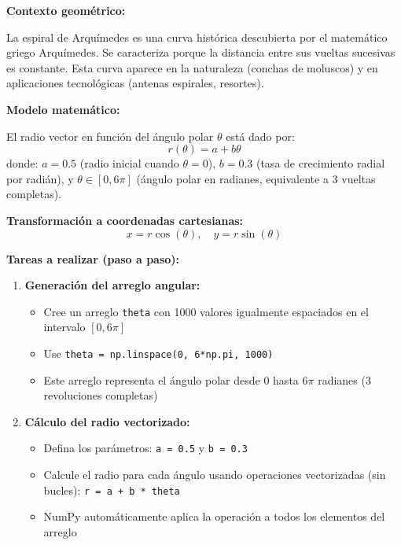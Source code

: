 \documentclass[10pt]{article}
\begin{document}

\begin{tcolorbox}[title={Pregunta 2 – Espiral de Arquímedes parametrizada}]

\noindent\textbf{Contexto geométrico:}

La espiral de Arquímedes es una curva histórica descubierta por el matemático griego Arquímedes. Se caracteriza porque la distancia entre sus vueltas sucesivas es constante. Esta curva aparece en la naturaleza (conchas de moluscos) y en aplicaciones tecnológicas (antenas espirales, resortes).

\noindent\textbf{Modelo matemático:}

El radio vector en función del ángulo polar $\theta$ está dado por:
\[
r(\theta) = a + b \theta
\]
donde: $a = 0.5$ (radio inicial cuando $\theta = 0$), $b = 0.3$ (tasa de crecimiento radial por radián), y $\theta \in [0, 6\pi]$ (ángulo polar en radianes, equivalente a 3 vueltas completas).

\noindent\textbf{Transformación a coordenadas cartesianas:}
\[
x = r \cos(\theta), \quad y = r \sin(\theta)
\]

\vspace{2mm}
\noindent\textbf{Tareas a realizar (paso a paso):}

\begin{enumerate}
  \item \textbf{Generación del arreglo angular:}
  \begin{itemize}
    \item Cree un arreglo \texttt{theta} con 1000 valores igualmente espaciados en el intervalo $[0, 6\pi]$ 
    \item Use \texttt{theta = np.linspace(0, 6*np.pi, 1000)}
    \item Este arreglo representa el ángulo polar desde 0 hasta $6\pi$ radianes (3 revoluciones completas)
  \end{itemize}
  
  \item \textbf{Cálculo del radio vectorizado:}
  \begin{itemize}
    \item Defina los parámetros: \texttt{a = 0.5} y \texttt{b = 0.3}
    \item Calcule el radio para cada ángulo usando operaciones vectorizadas (sin bucles): \texttt{r = a + b * theta}
    \item NumPy automáticamente aplica la operación a todos los elementos del arreglo
  \end{itemize}
  

\end{enumerate}
\end{tcolorbox}
\end{document}
